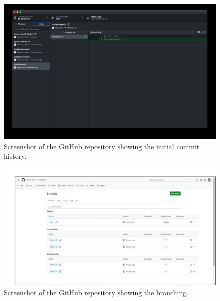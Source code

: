\documentclass[a4paper,12pt]{article}
\begin{document}
\begin{figure}[h!]
    \centering
     \hspace{4 cm}
     \includegraphics[width=0.8\linewidth]{commit.jpg} %
     \hspace{4 cm}
     \caption{Screenshot of the GitHub repository showing the initial commit history.}
\end{figure}

\begin{figure}[h!]
    \centering
    \includegraphics[width=0.8\linewidth]{branch.png} %
     \hspace{4 cm}
    \caption{Screenshot of the GitHub repository showing the branching.}
\end{figure}
\vspace{0 cm}
\end{document}

